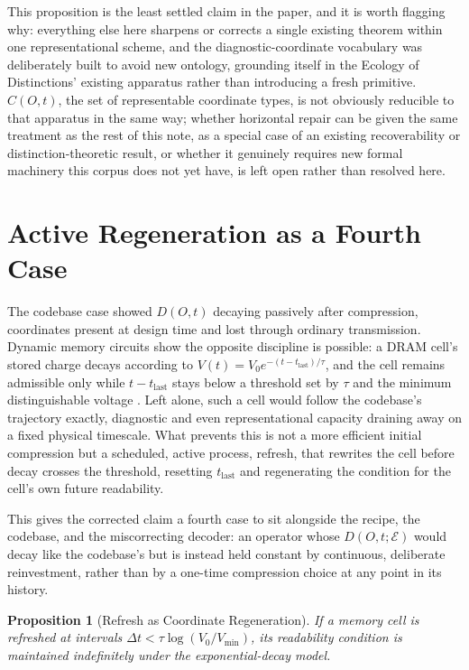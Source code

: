 \documentclass[11pt]{article}
\newtheorem{proposition}{Proposition}[section]
\begin{document}
This proposition is the least settled claim in the paper, and it is worth flagging why: everything else here sharpens or corrects a single existing theorem within one representational scheme, and the diagnostic-coordinate vocabulary was deliberately built to avoid new ontology, grounding itself in the Ecology of Distinctions' existing apparatus rather than introducing a fresh primitive. $C(O,t)$, the set of representable coordinate types, is not obviously reducible to that apparatus in the same way; whether horizontal repair can be given the same treatment as the rest of this note, as a special case of an existing recoverability or distinction-theoretic result, or whether it genuinely requires new formal machinery this corpus does not yet have, is left open rather than resolved here.

\section{Active Regeneration as a Fourth Case}

The codebase case showed $D(O,t)$ decaying passively after compression, coordinates present at design time and lost through ordinary transmission. Dynamic memory circuits show the opposite discipline is possible: a DRAM cell's stored charge decays according to $V(t) = V_0 e^{-(t - t_{\text{last}})/\tau}$, and the cell remains admissible only while $t - t_{\text{last}}$ stays below a threshold set by $\tau$ and the minimum distinguishable voltage \cite{circuitsbook}. Left alone, such a cell would follow the codebase's trajectory exactly, diagnostic and even representational capacity draining away on a fixed physical timescale. What prevents this is not a more efficient initial compression but a scheduled, active process, refresh, that rewrites the cell before decay crosses the threshold, resetting $t_{\text{last}}$ and regenerating the condition for the cell's own future readability.

This gives the corrected claim a fourth case to sit alongside the recipe, the codebase, and the miscorrecting decoder: an operator whose $D(O,t;\mathcal{E})$ would decay like the codebase's but is instead held constant by continuous, deliberate reinvestment, rather than by a one-time compression choice at any point in its history.

\begin{proposition}[Refresh as Coordinate Regeneration]
If a memory cell is refreshed at intervals $\Delta t < \tau \log(V_0/V_{\min})$, its readability condition is maintained indefinitely under the exponential-decay model.
\end{proposition}
\end{document}
